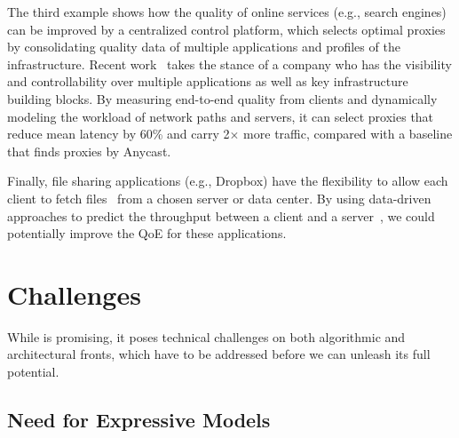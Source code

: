 The third example shows how the quality of online services 
(e.g., search engines) can be improved by a centralized 
control platform, which selects optimal proxies by consolidating
quality data of multiple applications and profiles of the infrastructure.
Recent work~\cite{footprint} takes the stance of a company who 
has the visibility and controllability over multiple applications as 
well as key infrastructure building blocks. 
By measuring end-to-end quality from clients and dynamically 
modeling the workload of network paths and servers, it can 
select proxies that reduce mean latency by 60\% and carry 2$\times$ 
more traffic, compared with a baseline that finds proxies by Anycast.

Finally, file sharing applications (e.g., Dropbox) have
the flexibility to allow each client to fetch files~\cite{drago2012inside} 
from a chosen server or data center.  By using data-driven 
 approaches to predict the throughput between a client and
a server~\cite{cs2p,spand,zhang2001constancy}, we could 
potentially improve the QoE for these applications.







\section{Challenges}
\label{sec:overview:challenges}

While \ddn is promising,
it poses technical challenges on both 
algorithmic and architectural fronts, which have to be 
addressed before we can unleash its full potential.

\subsection{Need for Expressive Models}
\label{subsec:overview:challenge1}

